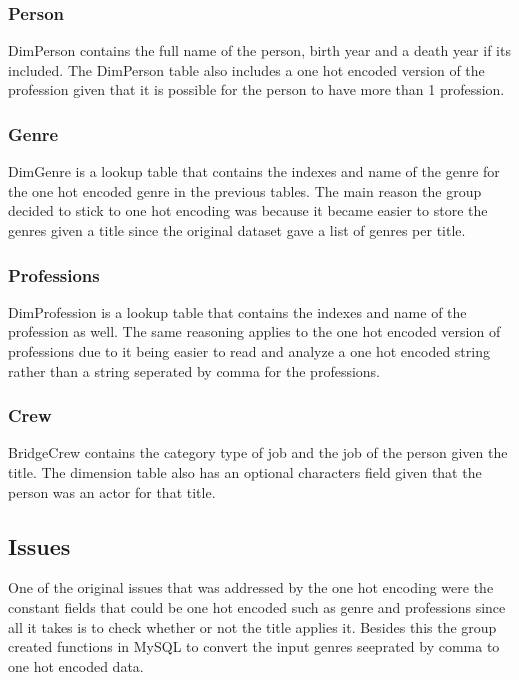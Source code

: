 \subsubsection{Person}
DimPerson contains the full name of the person, birth year and a death year if its included. The DimPerson table also includes a one hot encoded version of the profession given that it is possible for the person to have more than 1 profession.

\subsubsection{Genre}
DimGenre is a lookup table that contains the indexes and name of the genre for the one hot encoded genre in the previous tables. The main reason the group decided to stick to one hot encoding was because it became easier to store the genres given a title since the original dataset gave a list of genres per title. 

\subsubsection{Professions}
DimProfession is a lookup table that contains the indexes and name of the profession as well.
The same reasoning applies to the one hot encoded version of professions due to it being easier to read and analyze a one hot encoded string rather than a string seperated by comma for the professions.

\subsubsection{Crew}
BridgeCrew contains the category type of job and the job of the person given the title. The dimension table also has an optional characters field given that the person was an actor for that title.

\subsection{Issues}
One of the original issues that was addressed by the one hot encoding were the constant fields that could be one hot encoded such as genre and professions since all it takes is to check whether or not the title applies it. Besides this the group created functions in MySQL to convert the input genres seeprated by comma to one hot encoded data. 
\newline

